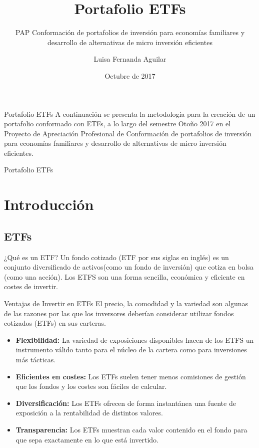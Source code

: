 \documentclass{beamer}
\title[Portafolio ETFs]{Portafolio ETFs}
\subtitle[Portafolio ETFs]{PAP Conformación de portafolios de inversión para economías
familiares y desarrollo de alternativas de micro inversión eficientes}
\author{Luisa Fernanda Aguilar}
\date{Octubre de 2017}
\begin{document}
\begin{frame}
  \titlepage
\end{frame}

\begin{frame}{Portafolio ETFs}
\justifying
A continuación se presenta la metodología para la creación de un portafolio conformado con ETFs, a lo largo del semestre Otoño 2017 en el Proyecto de Apreciación Profesional de Conformación de portafolios de inversión para economías familiares y desarrollo de alternativas de micro inversión eficientes.
\end{frame}

\begin{frame}{Portafolio ETFs}
  \tableofcontents
\end{frame}

\section{Introducción}

\subsection{ETFs}
\begin{frame}{¿Qué es un ETF?}
\justifying
Un fondo cotizado (ETF por sus siglas en inglés) es un conjunto diversificado de activos(como un fondo de inversión) que cotiza en bolsa (como una acción). Los ETFS son una forma sencilla, económica y eficiente en costes de invertir. 
\end{frame}

\begin{frame}{Ventajas de Invertir en ETFs}
\justifying
El precio, la comodidad y la variedad son algunas de las razones por las que los inversores deberían considerar utilizar fondos cotizados (ETFs) en sus carteras.
\begin{itemize}
\item \textbf{ Flexibilidad:} La variedad de exposiciones disponibles hacen de los ETFS un instrumento válido tanto para el núcleo de la cartera como para inversiones más tácticas.
\item \textbf{Eficientes en costes:} Los ETFs suelen tener menos comisiones de gestión que los fondos y los costes son fáciles de calcular.
\item \textbf{Diversificación:} Los ETFs ofrecen de forma instantánea una fuente de exposición a la rentabilidad de distintos valores.
\item \textbf{Transparencia:} Los ETFs muestran cada valor contenido en el fondo para que sepa exactamente en lo que está invertido.
\end{itemize}
\end{frame}
\end{document}
